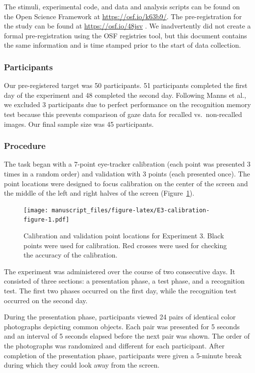 \documentclass[
  man,floatsintext]{apa6}
\begin{document}
The stimuli, experimental code, and data and analysis scripts can be
found on the Open Science Framework at \url{https://osf.io/k63b9/}.
The pre-registration for the study can be
found at \url{https://osf.io/48jsv} . We
inadvertently did not create a formal pre-registration using the OSF
registries tool, but this document contains the same information and is
time stamped prior to the start of data collection.

\hypertarget{participants-3}{%
\subsubsection{Participants}\label{participants-3}}

Our pre-registered target was 50 participants. 51 participants completed
the first day of the experiment and 48 completed the second day.
Following Manns et al., we excluded 3 participants due to perfect
performance on the recognition memory test because this prevents
comparison of gaze data for recalled vs.~non-recalled images. Our final
sample size was 45 participants.

\hypertarget{procedure-2}{%
\subsubsection{Procedure}\label{procedure-2}}

The task began with a 7-point eye-tracker calibration (each point was
presented 3 times in a random order) and validation with 3 points (each
presented once). The point locations were designed to focus calibration
on the center of the screen and the middle of the left and right halves
of the screen (Figure~\ref{fig:E3-calibration-figure}).

\begin{figure}
\centering
\texttt{[image: manuscript\_files/figure-latex/E3-calibration-figure-1.pdf]}
\caption{\label{fig:E3-calibration-figure}Calibration and validation point locations for Experiment 3. Black points were used for calibration. Red crosses were used for checking the accuracy of the calibration.}
\end{figure}

The experiment was administered over the course of two
consecutive days. It consisted of three sections: a presentation phase,
a test phase, and a recognition test. The first two phases occurred on
the first day, while the recognition test occurred on the second day.

During the presentation phase, participants viewed 24 pairs of identical
color photographs depicting common objects. Each pair was presented for
5 seconds and an interval of 5 seconds elapsed before the next pair was
shown. The order of the photographs was randomized and different for
each participant. After completion of the presentation phase,
participants were given a 5-minute break during which they could look
away from the screen.
\end{document}
